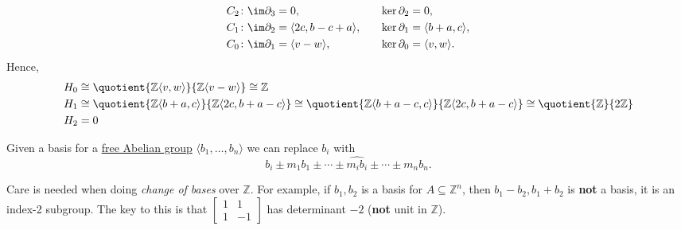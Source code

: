 \begin{explanation}
	\[
		\begin{alignedat}{3}
			C_2 & \colon \im \partial _3 = 0,                                     & \ker \partial _2 & = 0,                       \\
			C_1 & \colon \im \partial _2 = \langle 2c, b - c + a \rangle , \qquad & \ker \partial _1 & = \langle b +a, c \rangle, \\
			C_0 & \colon \im \partial _1 = \langle v - w\rangle ,                 & \ker \partial _0 & = \langle v, w\rangle.
		\end{alignedat}
	\]
	Hence,
	\[
		\begin{split}
			H_0 & \cong \quotient{\mathbb{Z} \langle v, w \rangle }{\mathbb{Z} \langle v - w \rangle } \cong \mathbb{Z}                                                                                                                                   \\
			H_1 & \cong \quotient{\mathbb{Z} \langle b + a, c \rangle }{\mathbb{Z} \langle 2c, b+a-c \rangle } \cong \quotient{\mathbb{Z} \langle b + a - c, c \rangle }{\mathbb{Z} \langle 2c, b+a-c \rangle } \cong \quotient{\mathbb{Z} }{2\mathbb{Z}} \\
			H_2 & = 0                                                                                                                                                                                                                                     \\
		\end{split}
	\]
\end{explanation}

\begin{remark}
	Given a basis for a \hyperref[def:free-Abelian-group]{free Abelian group} \(\langle  b_1, \dots, b_n  \rangle\) we can replace \(b_{i} \) with
	\[
		b_i \pm m_1b_1 \pm \cdots \pm \widehat{m_ib_i} \pm \cdots \pm m_n b_n.
	\]
\end{remark}

\begin{remark}
	Care is needed when doing \emph{change of bases} over \(\mathbb{Z} \). For example, if \(b_1, b_2\) is a basis for \(A \subseteq \mathbb{Z} ^n\), then \(b_1 - b_2, b_1 + b_2\) is \textbf{not} a basis, it is an index-2 subgroup. The key to this is that \(\begin{bmatrix} 1 & 1 \\ 1 & -1 \end{bmatrix}\) has determinant \(-2\) (\textbf{not} unit in \(\mathbb{Z}\)).
\end{remark}

